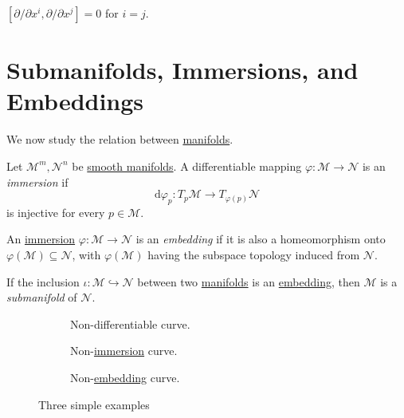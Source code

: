 \begin{eg}
	\([\partial / \partial x^i, \partial / \partial x^j] = 0\) for \(i = j\).
\end{eg}

\section{Submanifolds, Immersions, and Embeddings}
We now study the relation between \hyperref[def:smooth-manifold]{manifolds}.

\begin{definition}[Immersion]\label{def:immersion}
	Let \(\mathcal{M} ^m , \mathcal{N} ^n \) be \hyperref[def:smooth-manifold]{smooth manifolds}. A differentiable mapping \(\varphi \colon \mathcal{M} \to  \mathcal{N} \) is an \emph{immersion} if
	\[
		\mathrm{d} \varphi _p \colon T_p \mathcal{M} \to  T_{\varphi (p)} \mathcal{N}
	\]
	is injective for every \(p\in \mathcal{M} \).
\end{definition}

\begin{definition}[Embedding]\label{def:embedding}
	An \hyperref[def:immersion]{immersion} \(\varphi \colon \mathcal{M} \to \mathcal{N} \) is an \emph{embedding} if it is also a homeomorphism onto \(\varphi (\mathcal{M} )\subseteq \mathcal{N} \), with \(\varphi (\mathcal{M} )\) having the subspace topology induced from \(\mathcal{N} \).
\end{definition}

\begin{definition}[Submanifold]\label{def:submanifold}
	If the inclusion \(\iota \colon \mathcal{M} \hookrightarrow \mathcal{N} \) between two \hyperref[def:smooth-manifold]{manifolds} is an \hyperref[def:embedding]{embedding}, then \(\mathcal{M} \) is a \emph{submanifold} of \(\mathcal{N} \).
\end{definition}

\begin{figure}[H]
	\centering
	\begin{subfigure}[b]{0.3\textwidth}
		\centering
		\caption{Non-differentiable curve.}
	\end{subfigure}
	\hfill
	\begin{subfigure}[b]{0.3\textwidth}
		\centering
		\caption{Non-\hyperref[def:immersion]{immersion} curve.}
	\end{subfigure}
	\hfill
	\begin{subfigure}[b]{0.3\textwidth}
		\centering
		\caption{Non-\hyperref[def:embedding]{embedding} curve.}
	\end{subfigure}
	\caption{Three simple examples}
\end{figure}

